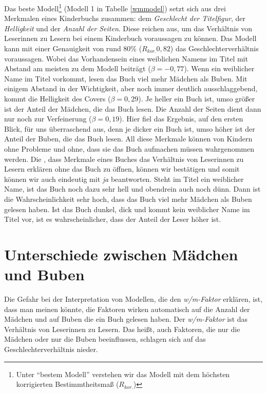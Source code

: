 Das beste
Modell\footnote{Unter \enquote{bestem Modell} verstehen wir das Modell mit dem höchsten korrigierten Bestimmtheitsmaß (\(R_{kor.}\))}
(Modell 1 in Tabelle \ref{wmmodel}) setzt sich aus drei Merkmalen eines
Kinderbuchs zusammen: dem \emph{Geschlecht der Titelfigur}, der
\emph{Helligkeit} und der \emph{Anzahl der Seiten}. Diese reichen aus,
um das Verhältnis von Leserinnen zu Lesern bei einem Kinderbuch
voraussagen zu können. Das Modell kann mit einer Genauigkeit von rund
80\% ($R_{kor.}0{,}82$) das Geschlechterverhältnis voraussagen. Wobei
das Vorhandensein eines weiblichen Namens im Titel mit Abstand am
meisten zu dem Modell beiträgt ($\beta=-0{,}77$). Wenn ein weiblicher
Name im Titel vorkommt, lesen das Buch viel mehr Mädchen als Buben. Mit
einigem Abstand in der Wichtigkeit, aber noch immer deutlich
ausschlaggebend, kommt die Helligkeit des Covers ($\beta=0{,}29$). Je
heller ein Buch ist, umso größer ist der Anteil der Mädchen, die das
Buch lesen. Die Anzahl der Seiten dient dann nur noch zur Verfeinerung
($\beta=0{,}19$). Hier fiel das Ergebnis, auf den ersten Blick, für uns
überraschend aus, denn je dicker ein Buch ist, umso höher ist der Anteil
der Buben, die das Buch lesen. All diese Merkmale können von Kindern
ohne Probleme und ohne, dass sie das Buch aufmachen müssen wahrgenommen
werden. Die , dass Merkmale eines Buches das Verhältnis von
Leserinnen zu Lesern erklären ohne das Buch zu öffnen, können wir
bestätigen und somit können wir auch  eindeutig mit
\emph{ja} beantworten. Steht im Titel ein weiblicher Name, ist das Buch
noch dazu sehr hell und obendrein auch noch dünn. Dann ist die
Wahrscheinlichkeit sehr hoch, dass das Buch viel mehr Mädchen als Buben
gelesen haben. Ist das Buch dunkel, dick und kommt kein weiblicher Name
im Titel vor, ist es wahrscheinlicher, dass der Anteil der Leser höher
ist.







\section{Unterschiede zwischen Mädchen und Buben}

Die Gefahr bei der Interpretation von Modellen, die den
\emph{w/m-Faktor} erklären, ist, dass man meinen könnte, die Faktoren
wirken automatisch auf die Anzahl der Mädchen und auf Buben die ein Buch
gelesen haben. Der \emph{w/m-Faktor} ist das Verhältnis von Leserinnen
zu Lesern. Das heißt, auch Faktoren, die nur die Mädchen oder nur die
Buben beeinflussen, schlagen sich auf das Geschlechterverhältnis nieder.

